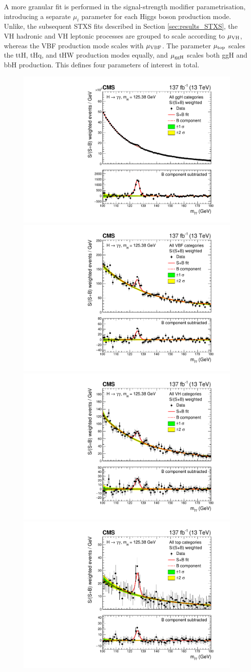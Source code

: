 A more granular fit is performed in the signal-strength modifier parametrisation, introducing a separate $\mu_i$ parameter for each Higgs boson production mode. Unlike, the subsequent STXS fits described in Section \ref{sec:results_STXS}, the VH hadronic and VH leptonic processes are grouped to scale according to $\mu_{\rm{VH}}$, whereas the VBF production mode scales with $\mu_{\rm{VBF}}$. The parameter $\mu_{\rm{top}}$ scales the ttH, tHq, and tHW production modes equally, and $\mu_{\rm{ggH}}$ scales both ggH and bbH production. This defines four parameters of interest in total.

\begin{figure}
  \centering
  \includegraphics[width=.49\textwidth]{Figures/hgg_results/sPlusBweighted_ggH.pdf}
  \includegraphics[width=.49\textwidth]{Figures/hgg_results/sPlusBweighted_VBF.pdf}
  \includegraphics[width=.49\textwidth]{Figures/hgg_results/sPlusBweighted_VH.pdf}
  \includegraphics[width=.49\textwidth]{Figures/hgg_results/sPlusBweighted_top.pdf}

\end{figure}
